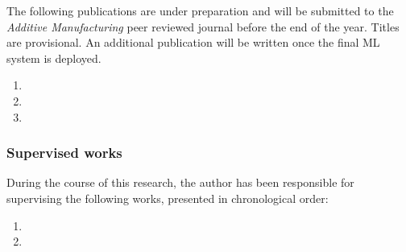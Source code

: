 \documentclass[main.tex]{subfiles}
\begin{document}
The following publications are under preparation and will be submitted to the \emph{Additive Manufacturing} peer reviewed journal before the end of the year. Titles are provisional. An additional publication will be written once the final ML system is deployed.

\begin{enumerate}
	\item {}
	\item {}
	\item {}
\end{enumerate}

\pagebreak

\subsubsection{Supervised works}
During the course of this research, the author has been responsible for supervising the following works, presented in chronological order:

\begin{enumerate}
	\item {} %
	\item {} %
\end{enumerate}

% 
%
%
%
%

\end{document}
